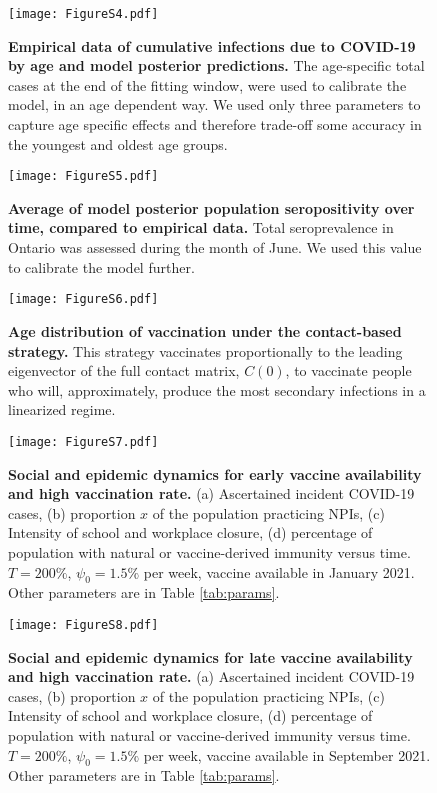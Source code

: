 \documentclass[10pt,onecolumn,twoside,lineno]{pnas-new}
\begin{document}
\clearpage 

\begin{figure}[H]
\centering
\texttt{[image: FigureS4.pdf]}
\caption{\textbf{Empirical data of cumulative infections due to COVID-19 by age and model posterior predictions.} The age-specific total cases at the end of the fitting window, were used to calibrate the model, in an age dependent way. We used only three parameters to capture age specific effects and therefore trade-off some accuracy in the youngest and oldest age groups.}
\label{plot_model}
\end{figure}

\clearpage 

\begin{figure}[H]
\centering
\texttt{[image: FigureS5.pdf]}
\caption{\textbf{Average of model posterior population seropositivity over time, compared to empirical data.} Total seroprevalence in Ontario was assessed during the month of June. We used this value to calibrate the model further.  }
\label{plot_model}
\end{figure}

\clearpage 

\begin{figure}[H]
\centering
\texttt{[image: FigureS6.pdf]}
\caption{\textbf{Age distribution of vaccination under the contact-based strategy.} This strategy vaccinates proportionally to the leading eigenvector of the full contact matrix, $C(0)$, to vaccinate people who will, approximately, produce the most secondary infections in a linearized regime.}
\label{plot_model}
\end{figure}

\clearpage 

\begin{figure}[H]
\centering
\texttt{[image: FigureS7.pdf]}
\caption{\textbf{Social and epidemic dynamics for early vaccine availability and high vaccination rate.} (a) Ascertained incident COVID-19 cases, (b) proportion $x$ of the population practicing NPIs, (c) Intensity of school and workplace closure, (d) percentage of population with natural or vaccine-derived immunity versus time. $T=200 \%$, $\psi_0=1.5 \%$ per week, vaccine available in January 2021.   Other parameters are in Table \ref{tab:params}.}
\label{plot_model}
\end{figure}

\clearpage 

\begin{figure}[H]
\centering
\texttt{[image: FigureS8.pdf]}
\caption{\textbf{Social and epidemic dynamics for late vaccine availability and high vaccination rate.} (a) Ascertained incident  COVID-19 cases, (b) proportion $x$ of the population practicing NPIs, (c) Intensity of school and workplace closure, (d) percentage of population with natural or vaccine-derived immunity versus time. $T=200 \%$, $\psi_0=1.5 \%$ per week, vaccine available in September 2021.   Other parameters are in Table \ref{tab:params}.}
\label{plot_model}
\end{figure}
\end{document}
